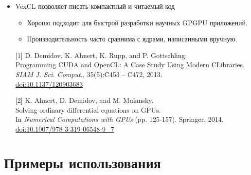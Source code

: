 \documentclass[@BEAMER_OPTIONS@]{beamer}
\newcommand{\CXX}{{\rm C}\plusplus}
\begin{document}
\begin{frame}[fragile]{}
    \begin{itemize}
        \item VexCL позволяет писать компактный и читаемый код
            \begin{itemize}
                \item Хорошо подходит для быстрой разработки научных GPGPU
                    приложений.
                \item Производительность часто сравнима с ядрами, написанными
                    вручную.
            \end{itemize}
    \end{itemize}
    \vspace{\baselineskip}
    \begin{itemize}
        \item[{[1]}] D. Demidov, K. Ahnert, K. Rupp, and P. Gottschling.\\
            Programming CUDA and OpenCL: A Case Study Using Modern \CXX Libraries.\\
            \emph{SIAM J. Sci. Comput.,} 35(5):C453 – C472, 2013.\\
            \href{http://dx.doi.org/10.1137/120903683}{doi:10.1137/120903683}
        \item[{[2]}] K. Ahnert, D. Demidov, and M. Mulansky.\\
            Solving ordinary differential equations on GPUs.\\
            In \emph{Numerical Computations with GPUs} (pp. 125-157).  Springer, 2014.
            \href{http://dx.doi.org/10.1007/978-3-319-06548-9\_7}{doi:10.1007/978-3-319-06548-9\_7}
    \end{itemize}
\end{frame}

\section{Примеры использования}

\begin{frame}
    \sectionpage
\end{frame}
\end{document}
